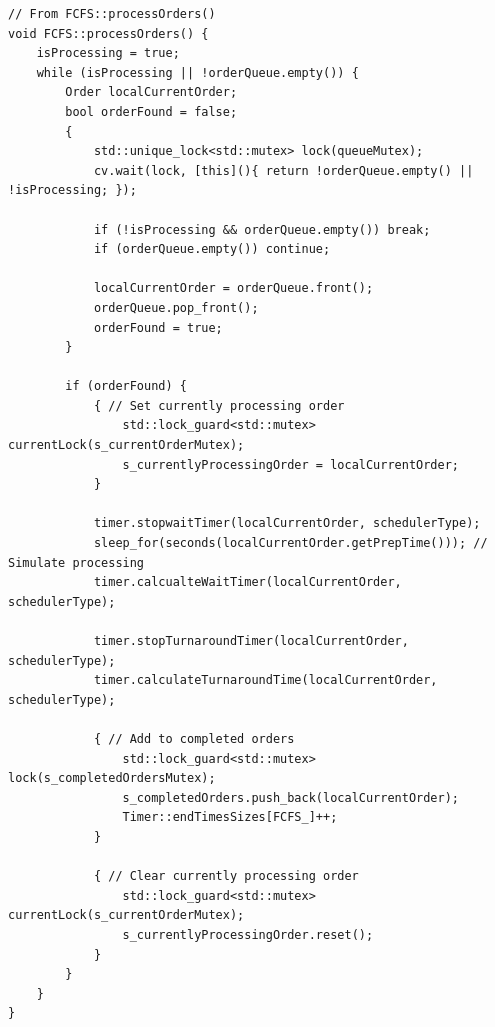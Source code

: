 \documentclass[a4paper,12pt]{article}
\begin{document}
\begin{verbatim}
// From FCFS::processOrders()
void FCFS::processOrders() {
    isProcessing = true;
    while (isProcessing || !orderQueue.empty()) {
        Order localCurrentOrder;
        bool orderFound = false;
        {
            std::unique_lock<std::mutex> lock(queueMutex);
            cv.wait(lock, [this](){ return !orderQueue.empty() || !isProcessing; });
            
            if (!isProcessing && orderQueue.empty()) break;
            if (orderQueue.empty()) continue;

            localCurrentOrder = orderQueue.front();
            orderQueue.pop_front();
            orderFound = true;
        }

        if (orderFound) {
            { // Set currently processing order
                std::lock_guard<std::mutex> currentLock(s_currentOrderMutex);
                s_currentlyProcessingOrder = localCurrentOrder;
            }
            
            timer.stopwaitTimer(localCurrentOrder, schedulerType);
            sleep_for(seconds(localCurrentOrder.getPrepTime())); // Simulate processing
            timer.calcualteWaitTimer(localCurrentOrder, schedulerType);
            
            timer.stopTurnaroundTimer(localCurrentOrder, schedulerType);
            timer.calculateTurnaroundTime(localCurrentOrder, schedulerType);

            { // Add to completed orders
                std::lock_guard<std::mutex> lock(s_completedOrdersMutex);
                s_completedOrders.push_back(localCurrentOrder);
                Timer::endTimesSizes[FCFS_]++;
            }

            { // Clear currently processing order
                std::lock_guard<std::mutex> currentLock(s_currentOrderMutex);
                s_currentlyProcessingOrder.reset();
            }
        }
    }
}
\end{verbatim}
    
\end{document}
